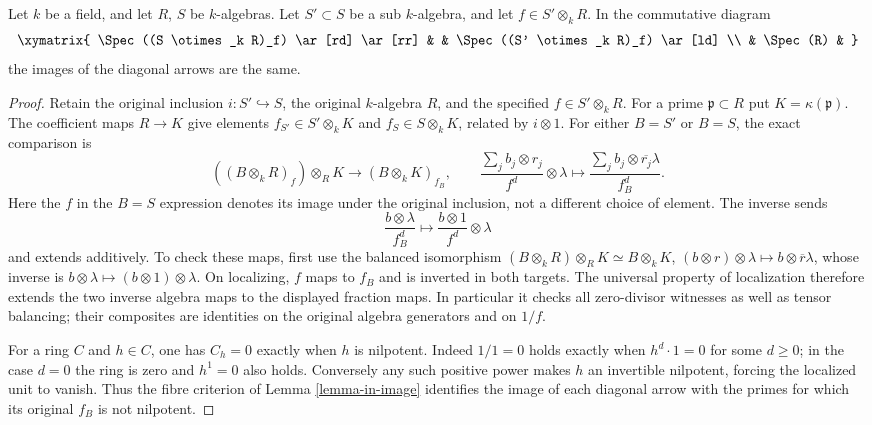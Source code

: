 \begin{lemma}
\label{lemma-same-image}
Let $k$ be a field, and let $R$, $S$ be $k$-algebras.
Let $S' \subset S$ be a sub $k$-algebra, and let $f \in S' \otimes_k R$.
In the commutative diagram
$$
\xymatrix{
\Spec((S \otimes_k R)_f) \ar[rd] \ar[rr] & &
\Spec((S' \otimes_k R)_f) \ar[ld] \\
& \Spec(R) &
}
$$
the images of the diagonal arrows are the same.
\end{lemma}

\begin{proof}
Retain the original inclusion $i:S'\hookrightarrow S$,
the original $k$-algebra $R$, and the specified
$f\in S'\otimes_kR$. For a prime $\mathfrak p\subset R$
put $K=\kappa(\mathfrak p)$. The coefficient maps
$R\to K$ give elements $f_{S'}\in S'\otimes_kK$
and $f_S\in S\otimes_kK$, related by $i\otimes1$.
For either $B=S'$ or $B=S$, the exact comparison is
$$
((B\otimes_kR)_f)\otimes_RK
\longrightarrow (B\otimes_kK)_{f_B},
\qquad
\frac{\sum_j b_j\otimes r_j}{f^d}\otimes\lambda
\longmapsto
\frac{\sum_j b_j\otimes\overline{r_j}\lambda}{f_B^d}.
$$
Here the $f$ in the $B=S$ expression denotes its
image under the original inclusion, not a different
choice of element. The inverse sends
$$
\frac{b\otimes\lambda}{f_B^d}
\longmapsto \frac{b\otimes1}{f^d}\otimes\lambda
$$
and extends additively. To check these maps, first use
the balanced isomorphism
$(B\otimes_kR)\otimes_RK\simeq B\otimes_kK$,
$(b\otimes r)\otimes\lambda\mapsto b\otimes\overline r\lambda$,
whose inverse is $b\otimes\lambda\mapsto(b\otimes1)\otimes\lambda$.
On localizing, $f$ maps to $f_B$ and is inverted in
both targets. The universal property of localization
therefore extends the two inverse algebra maps to
the displayed fraction maps. In particular it checks
all zero-divisor witnesses as well as tensor balancing;
their composites are identities on the original
algebra generators and on $1/f$.

For a ring $C$ and $h\in C$, one has $C_h=0$
exactly when $h$ is nilpotent. Indeed $1/1=0$
holds exactly when $h^d\cdot1=0$ for some
$d\geq0$; in the case $d=0$ the ring is zero
and $h^1=0$ also holds. Conversely any such positive
power makes $h$ an invertible nilpotent, forcing the
localized unit to vanish. Thus the fibre criterion
of Lemma \ref{lemma-in-image} identifies the image
of each diagonal arrow with the primes for which
its original $f_B$ is not nilpotent.


\end{proof}
